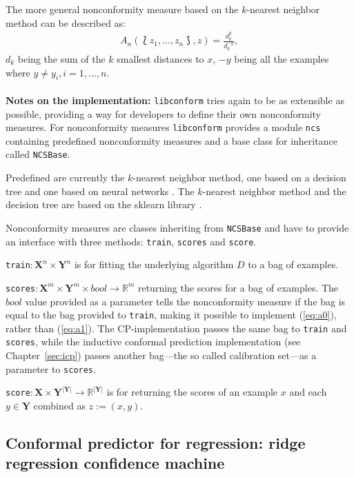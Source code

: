 \documentclass[twoside,11pt]{article}
\def\libconform{\texttt{libconform}}
\begin{document}
The more general nonconformity measure based on the
$k$-nearest neighbor method can be described as:
\begin{align*}
  A_n(\Lbag z_1,\dots,z_n \Rbag, z)=\frac{d_k^y}{d_k^{-y}},
\end{align*}
$d_k$ being the sum of the $k$ smallest distances to $x$,
$-y$ being all the examples where
$y \neq y_i, i = 1,\dots,n$.
\\\\

\noindent
\textbf{Notes on the implementation:}
\libconform{} tries again to be as extensible as possible,
providing a way for developers to define their own
nonconformity measures. For nonconformity measures
\libconform{} provides a module \texttt{ncs} containing
predefined nonconformity measures and a base class for
inheritance called \texttt{NCSBase}.

Predefined are currently the $k$-nearest neighbor method,
one based on a decision tree \citep[see][Chapter 4]{alrw}
and one based on neural networks
\citep[see][Chapter 4]{papadopoulos_et_al_2007,alrw}.
The $k$-nearest neighbor method and the decision tree
are based on the sklearn library
\citep[see][]{sklearn_api}.

Nonconformity measures are classes inheriting from
\texttt{NCSBase} and have to provide an interface with
three methods: \texttt{train}, \texttt{scores} and
\texttt{score}.

\texttt{train}$: \textbf{X}^n \times \textbf{Y}^n$ is for
fitting the underlying algorithm $D$ to a bag of examples.

\texttt{scores}$: \textbf{X}^m \times \textbf{Y}^m \times
bool \rightarrow \mathbb{R}^m$ returning the scores for a
bag of examples. The $bool$ value provided as a parameter
tells the nonconformity measure if the bag is equal to the
bag provided to \texttt{train}, making it possible to
implement (\ref{eq:a0}), rather than (\ref{eq:a1}).
The CP-implementation passes the same bag to \texttt{train}
and \texttt{scores}, while the inductive conformal
prediction implementation (see Chapter~\ref{sec:icp})
passes another bag---the so called calibration set---as a
parameter to \texttt{scores}.

\texttt{score}$: \textbf{X} \times
\textbf{Y}^{|\textbf{Y}|} \rightarrow
\mathbb{R}^{|\textbf{Y}|}$ is for returning the scores of
an example $x$ and each $y \in \textbf{Y}$ combined as
$z := (x, y)$.

\subsection{Conformal predictor for regression: ridge
            regression confidence machine}
\label{subsec:rrcm}
\end{document}
